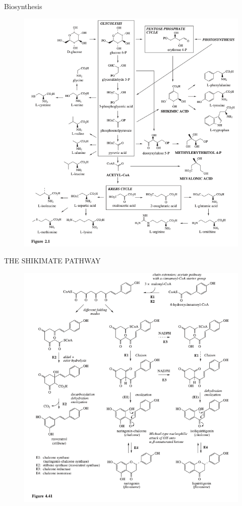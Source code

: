 \documentclass[11pt]{beamer}
\begin{document}
\begin{frame}{Biosynthesis}

	\begin{figure}
		\centering
		\includegraphics[scale=0.3]{Figure 2.1.png}
	\end{figure}
\end{frame}
\begin{frame}{THE SHIKIMATE PATHWAY}
	\begin{figure}
		\centering
		\includegraphics[scale=0.3]{Figure 4.41.png}
	\end{figure}
\end{frame}
\end{document}

